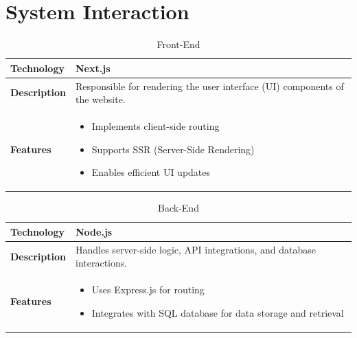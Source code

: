 \documentclass{scrreprt}
\begin{document}
\begin{table}[ht]
    
\section{System Interaction}
    \centering
    \caption{Front-End}
    \begin{tabular}{|p{4cm}|p{10cm}|}
    \hline
    \textbf{Technology} & Next.js \\
    \hline
    \textbf{Description} & Responsible for rendering the user interface (UI) components of the website. \\
    \hline
    \textbf{Features} &
    \begin{itemize}[label=$\bullet$]
      \item Implements client-side routing
      \item Supports SSR (Server-Side Rendering)
      \item Enables efficient UI updates
    \end{itemize} \\
    \hline
    \end{tabular}
    \end{table}
    
    \vspace{0.5cm}
    
    \begin{table}[ht]
    \centering
    \caption{Back-End}
    \begin{tabular}{|p{4cm}|p{10cm}|}
    \hline
    \textbf{Technology} & Node.js \\
    \hline
    \textbf{Description} & Handles server-side logic, API integrations, and database interactions. \\
    \hline
    \textbf{Features} &
    \begin{itemize}[label=$\bullet$]
      \item Uses Express.js for routing
      \item Integrates with SQL database for data storage and retrieval
    \end{itemize} \\
    \hline
    \end{tabular}
    \end{table}
    
    \vspace{0.5cm}
    
\end{document}
